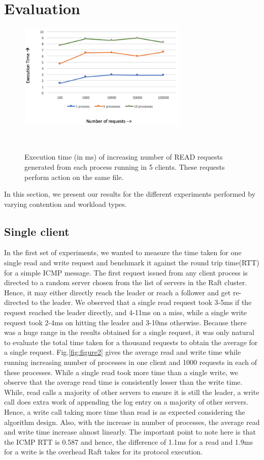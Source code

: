 \section{Evaluation}

\begin{figure}
\centering
\includegraphics[height=2in, width=3.2in]{images/F-HC-SF-R.png}
\caption{Execution time (in ms) of increasing number of READ requests generated from each process running in 5 clients. These requests perform action on the same file.}~\label{fig:figure3}
\end{figure}

In this section, we present our results for the different experiments performed by varying contention and workload types.

\subsection{Single client}

In the first set of experiments, we wanted to measure the time taken for one single read and write request and benchmark it against the round trip time(RTT) for a simple ICMP message. The first request issued from any client process is directed to a random server chosen from the list of servers in the Raft cluster. Hence, it may either directly reach the leader or reach a follower and get re-directed to the leader. We observed that a single read request took 3-5ms if the request reached the leader directly, and  4-11ms on a miss, while a single write request took 2-4ms on hitting the leader and 3-10ms otherwise. Because there was a huge range in the results obtained for a single request, it was only natural to evaluate the total time taken for a thousand requests to obtain the average for a single request. Fig.\ref{fig:figure2} gives the average read and write time while running increasing number of processes in one client and 1000 requests in each of these processes. While a single read took more time than a single write, we observe that the average read time is consistently lesser than the write time. While, read calls a majority of other servers to ensure it is still the leader, a write call does extra work of appending the log entry on a majority of other servers. Hence, a write call taking more time than read is as expected considering the algorithm design. Also, with the increase in number of processes, the average read and write time increase almost linearly. The important point to note here is that the ICMP RTT is 0.587 and hence, the difference of 1.1ms for a read and 1.9ms for a write is the overhead Raft takes for its protocol execution. 

